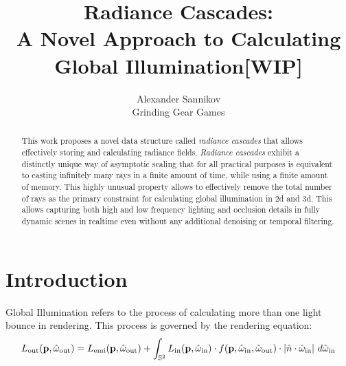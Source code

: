 \documentclass{jcgt}
\begin{document}
\title{Radiance Cascades:\\A Novel Approach to Calculating Global Illumination[WIP]}

\author
       {Alexander Sannikov\\Grinding Gear Games
       }


\maketitle
\thispagestyle{firstpagestyle}

\begin{abstract}
\small
This work proposes a novel data structure called \emph{radiance cascades} that allows effectively storing and calculating radiance fields. \emph{Radiance cascades} exhibit a distinctly unique way of asymptotic scaling that for all practical purposes is equivalent to casting infinitely many rays in a finite amount of time, while using a finite amount of memory. This highly unusual property allows to effectively remove the total number of rays as the primary constraint for calculating global illumination in 2d and 3d. This allows capturing both high and low frequency lighting and occlusion details in fully dynamic scenes in realtime even without any additional denoising or temporal filtering.
\end{abstract}


\section{Introduction}
\label{sec:introduction}
Global Illumination refers to the process of calculating more than one light bounce in rendering. This process is governed by the rendering equation:
\begin{equation}
  L_\mathrm{out}(\textbf{p}, \hat \omega_\mathrm{out}) = L_\mathrm{emi}(\textbf{p}, \hat \omega_\mathrm{out}) + \int_{\mathbb{S}^2} L_\mathrm{in}(\textbf{p}, \hat \omega_\mathrm{in}) \cdot f(\textbf p, \hat \omega_\mathrm{in}, \hat{\omega}_\mathrm{out}) \cdot |\hat{n} \cdot \hat{\omega}_\mathrm{in} |~ d\hat{\omega}_\mathrm{in}
  \label{eqn:rendering}
\end{equation}
  
\end{document}
